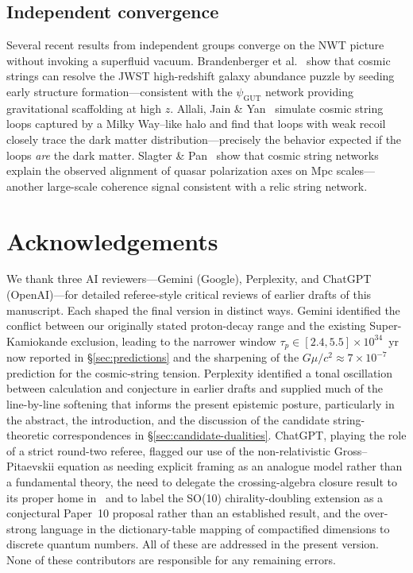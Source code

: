 \documentclass[11pt]{article}
\begin{document}
\subsection{Independent convergence}

Several recent results from independent groups converge on the NWT picture without invoking a superfluid vacuum.
Brandenberger et al.~\cite{Brandenberger2025} show that cosmic strings can resolve the JWST high-redshift galaxy abundance puzzle by seeding early structure formation---consistent with the $\psi_\text{GUT}$ network providing gravitational scaffolding at high $z$.
Allali, Jain \& Yan~\cite{Allali2025} simulate cosmic string loops captured by a Milky Way--like halo and find that loops with weak recoil closely trace the dark matter distribution---precisely the behavior expected if the loops \emph{are} the dark matter.
Slagter \& Pan~\cite{Slagter2017} show that cosmic string networks explain the observed alignment of quasar polarization axes on Mpc scales---another large-scale coherence signal consistent with a relic string network.

\section*{Acknowledgements}

We thank three AI reviewers---Gemini (Google), Perplexity, and ChatGPT (OpenAI)---for detailed referee-style critical reviews of earlier drafts of this manuscript.
Each shaped the final version in distinct ways.
Gemini identified the conflict between our originally stated proton-decay range and the existing Super-Kamiokande exclusion, leading to the narrower window $\tau_p \in [2.4, 5.5]\times 10^{34}$~yr now reported in \S\ref{sec:predictions} and the sharpening of the $G\mu/c^2 \approx 7\times 10^{-7}$ prediction for the cosmic-string tension.
Perplexity identified a tonal oscillation between calculation and conjecture in earlier drafts and supplied much of the line-by-line softening that informs the present epistemic posture, particularly in the abstract, the introduction, and the discussion of the candidate string-theoretic correspondences in \S\ref{sec:candidate-dualities}.
ChatGPT, playing the role of a strict round-two referee, flagged our use of the non-relativistic Gross--Pitaevskii equation as needing explicit framing as an analogue model rather than a fundamental theory, the need to delegate the crossing-algebra closure result to its proper home in~\cite{NWT8} and to label the SO(10) chirality-doubling extension as a conjectural Paper~10 proposal rather than an established result, and the over-strong language in the dictionary-table mapping of compactified dimensions to discrete quantum numbers.
All of these are addressed in the present version.
None of these contributors are responsible for any remaining errors.
\end{document}
